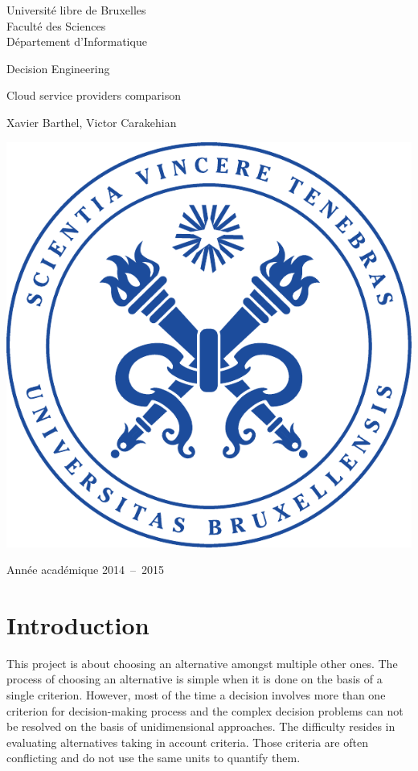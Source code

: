 \documentclass[a4paper,11pt]{article}
\begin{document}
\begin{titlepage}
\begin{center}
	{\sc Université libre de Bruxelles}\\
	Faculté des Sciences\\
	Département d'Informatique
	\vfill{}\vfill{}

	{\Huge \par}{\Huge Decision Engineering}{\Huge \par}
	{\Huge \par}{\huge Cloud service providers comparison}{\Huge \par}

	{\huge \par}{\Large Xavier Barthel, }
				{\Large Victor Carakehian}{\huge \par}
	
	\vfill{}
	\includegraphics{img/ulb_symbol.pdf}

	\vfill{}\vfill{}
	Année académique 2014~--~2015
\end{center}
\end{titlepage}

\section{Introduction}
This project is about choosing an alternative amongst multiple other ones. The process of choosing an alternative is simple when it is done on the basis of a single criterion. However, most of the time a decision involves more than one criterion for decision-making process and the complex decision problems can not be resolved on the basis of unidimensional approaches. The difficulty resides in evaluating alternatives taking in account criteria. Those criteria are often conflicting and do not use the same units to quantify them.\\
\end{document}
